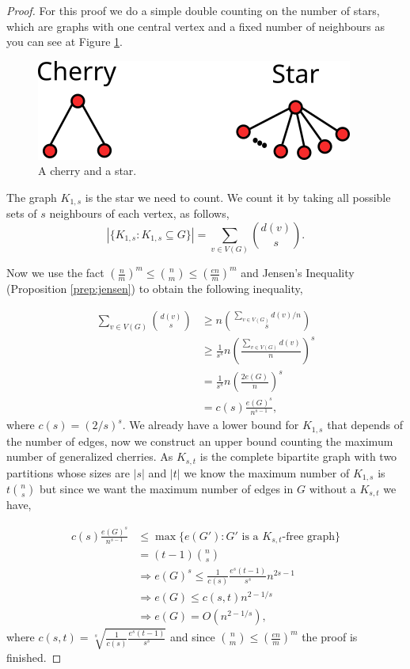 \documentclass[12pt,twoside,a4paper,bibliography=totocnumbered]{book}
\numberwithin{equation}{section}
\theoremstyle{remark}
\begin{document}
\begin{proof}

For this proof we do a simple double counting on the number of stars, which are graphs with one central vertex and a fixed number of neighbours as you can see at Figure \ref{fig:generalizedcherry}.

\begin{figure}[!htb]
     \centering
     \includegraphics[scale=1]{Figuras/cherry-and-star.png}
     \caption{A cherry and a star.}
     \label{fig:generalizedcherry}
\end{figure}

The graph $K_{1,s}$ is the star we need to count. We count it by taking all possible sets of $s$ neighbours of each vertex, as follows,
$$ |\{K_{1,s}\colon K_{1,s} \subseteq G\}| = \sum_{v \in V(G)} \binom{d(v)}{s} .$$

Now we use the fact $\left(\frac{n}{m}\right)^m \leq \binom{n}{m} \leq \left(\frac{en}{m}\right)^m$ and Jensen's Inequality (Proposition \ref{prep:jensen}) to obtain the following inequality,

\begin{align*} 
\sum_{v \in V(G)} \binom{d(v)}{s} & \geq n\binom{\sum_{v \in V(G)} d(v)/n}{s}\\ 
& \geq \frac{1}{s^s} n \left( \frac{\sum_{v \in V(G)} d(v)}{n} \right) ^s \\
& = \frac{1}{s^s} n \left( \frac{ 2 e(G)}{n} \right) ^s \\
& = c(s) \frac{e(G)^s}{n^{s-1}},
\end{align*}
where $c(s) = \left(2/s\right)^s$.
We already have a lower bound for $K_{1,s}$ that depends of the number of edges, now we construct an upper bound counting the maximum number of generalized cherries.
As $K_{s,t}$ is the complete bipartite graph with two partitions whose sizes are $|s|$ and $|t|$ we know the maximum number of $K_{1,s}$ is $t\binom{n}{s}$ but since we want the maximum number of edges in $G$ without a $K_{s,t}$ we have,

\begin{align*}
c(s) \frac{e(G)^s}{n^{s-1}} &\leq \max\{e(G')\colon G' \text{ is a } K_{s,t}\text{-free graph}\} \\
& = (t-1) \binom{n}{s}\\
		       & \Rightarrow e(G)^s \leq \frac{1}{c(s)}\frac{e^s(t-1)}{s^s}n^{2s-1}\\
		       &\Rightarrow e(G) \leq c(s,t) n^{2-1/s}\\
		       &\Rightarrow e(G) = O(n^{2-1/s}),
\end{align*}
where $c(s,t)= \sqrt[s]{\frac{1}{c(s)}\frac{e^s(t-1)}{s^s}}$ and since $\binom{n}{m} \leq \left(\frac{en}{m}\right)^m$ the proof is finished.
\end{proof}
\end{document}
